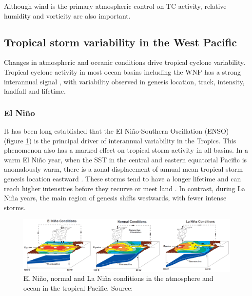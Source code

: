 Although wind is the primary atmospheric control on TC activity, relative humidity and vorticity are also important.


\subsection{Tropical storm variability in the West Pacific}

Changes in atmospheric and oceanic conditions drive tropical cyclone variability. Tropical cyclone activity in most ocean basins including the WNP has a strong interannual signal \citep{landsea2000climate}, with variability observed in genesis location, track, intensity, landfall and lifetime.%



\subsubsection{El Ni\~{n}o}

It has been long established that the El Ni\~{n}o-Southern Oscillation (ENSO) (figure \ref{fig:nino}) is the principal driver of interannual variability in the Tropics. This phenomenon also has a marked effect on tropical storm activity in all basins. In a warm El Ni\~{n}o year, when the SST in the central and eastern equatorial Pacific is anomalously warm, there is a zonal displacement of annual mean tropical storm genesis location eastward \citep{lander1994exploratory, zhan2011contributions}. These storms tend to have a longer lifetime and can reach higher intensities before they recurve or meet land \citep{camargo2007cluster, chan1998seasonal}. In contrast, during La Ni\~{n}a years, the main region of genesis shifts westwards, with fewer intense storms.


\begin{figure}[h]
	\centering
	\noindent\includegraphics[width=40pc,angle=0]{Stressors_ENSO3.png}
	\caption{El Ni\~{n}o, normal and La Ni\~{n}a conditions in the atmosphere and ocean in the tropical Pacific. Source: \cite{noaa_enso}}\label{fig:nino}
\end{figure}


